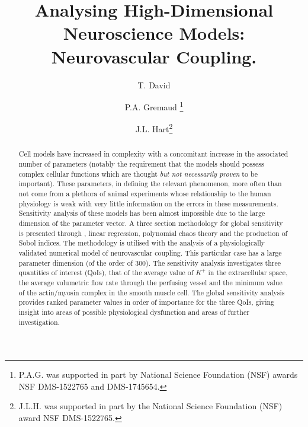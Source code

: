 \documentclass[smallextended]{svjour3}
\numberwithin{equation}{section}
\begin{document}
\title{Analysing High-Dimensional Neuroscience Models: Neurovascular Coupling. }
\author{ T. David \and P.A. Gremaud  \thanks{P.A.G. was supported in part by National Science Foundation (NSF) awards NSF DMS-1522765 and DMS-1745654.}\and J.L. Hart\thanks{J.L.H. was supported in part by the National Science Foundation (NSF) award NSF DMS-1522765.}}
\maketitle
\thispagestyle{empty}

\begin{abstract}
Cell models have increased in complexity with a concomitant increase in the associated number of parameters (notably the requirement that the models should possess complex cellular functions which are thought \textit{but not necessarily proven} to be important). These parameters, in defining the relevant phenomenon, more often than not come from a plethora of animal experiments whose relationship to the human physiology is weak with very little information on the errors in these measurements.  Sensitivity analysis of these models has been almost impossible due to the large dimension of the parameter vector. A three section methodology for global sensitivity is presented through , linear regression, polynomial chaos theory and the production of Sobol indices. The methodology is utilised with the analysis of a physiologically validated numerical model of  neurovascular coupling. This particular case has a large parameter dimension (of the order of 300). The sensitivity analysis investigates three quantities of interest (QoIs), that of the  average value of $K^+$ in the extracellular space, the average volumetric flow rate through the perfusing vessel and the minimum value of the actin/myosin complex in the smooth muscle cell. The global sensitivity analysis provides ranked parameter values in order of importance for the three QoIs, giving insight into areas of possible physiological dysfunction and areas of further investigation. 
\end{abstract}




  










 

\end{document}

